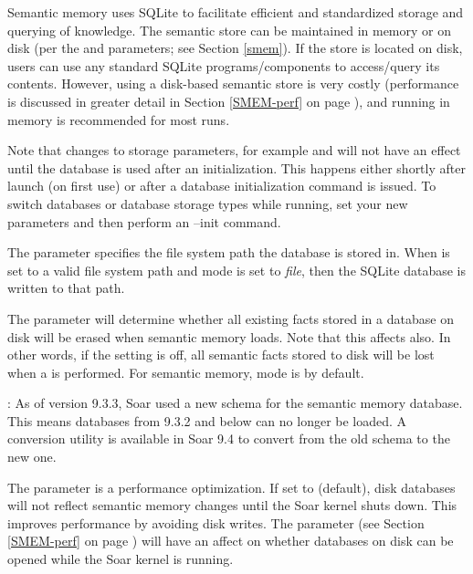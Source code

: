Semantic memory uses SQLite to facilitate efficient and standardized storage and querying of knowledge.
The semantic store can be maintained in memory or on disk (per the  and  parameters; see Section \ref{smem}).
If the store is located on disk, users can use any standard SQLite programs/components to access/query its contents.
However, using a disk-based semantic store is very costly (performance is discussed in greater detail in Section \ref{SMEM-perf} on page \pageref{SMEM-perf}), and running in memory is recommended for most runs.

Note that changes to storage parameters, for example  and  will not have an effect until the database is used after an initialization. This happens either shortly after launch (on first use) or after a database initialization command is issued. To switch databases or database storage types while running, set your new parameters and then perform an --init command.

The  parameter specifies the file system path the database is stored in. When  is set to a valid file system path and  mode is set to \emph{file}, then the SQLite database is written to that path.

The  parameter will determine whether all existing facts stored in a database on disk will be erased when semantic memory loads. Note that this affects  also.  In other words, if the  setting is off, all semantic facts stored to disk will be lost when a  is performed. For semantic memory,  mode is  by default.

: As of version 9.3.3, Soar used a new schema for the semantic memory database. This means databases from 9.3.2 and below can no longer be loaded.  A conversion utility is available in Soar 9.4 to convert from the old schema to the new one.

The  parameter is a performance optimization.
If set to  (default), disk databases will not reflect semantic memory changes until the Soar kernel shuts down.
This improves performance by avoiding disk writes.
The  parameter (see Section \ref{SMEM-perf} on page \pageref{SMEM-perf}) will have an affect on whether databases on disk can be opened while the Soar kernel is running.


